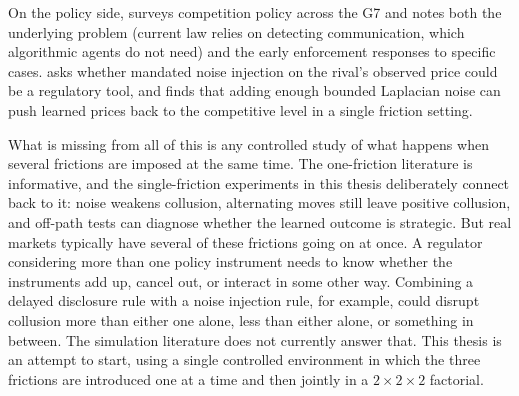 On the policy side, \citet{oecd2025} surveys competition policy across the G7 and notes both the underlying problem (current law relies on detecting communication, which algorithmic agents do not need) and the early enforcement responses to specific cases. \citet{zhang2025} asks whether mandated noise injection on the rival's observed price could be a regulatory tool, and finds that adding enough bounded Laplacian noise can push learned prices back to the competitive level in a single friction setting.

What is missing from all of this is any controlled study of what happens when several frictions are imposed at the same time. The one-friction literature is informative, and the single-friction experiments in this thesis deliberately connect back to it: noise weakens collusion, alternating moves still leave positive collusion, and off-path tests can diagnose whether the learned outcome is strategic. But real markets typically have several of these frictions going on at once. A regulator considering more than one policy instrument needs to know whether the instruments add up, cancel out, or interact in some other way. Combining a delayed disclosure rule with a noise injection rule, for example, could disrupt collusion more than either one alone, less than either alone, or something in between. The simulation literature does not currently answer that. This thesis is an attempt to start, using a single controlled environment in which the three frictions are introduced one at a time and then jointly in a $2\times 2\times 2$ factorial.
